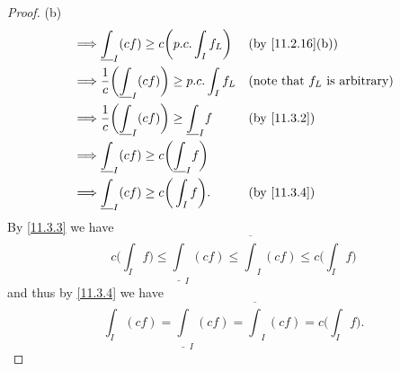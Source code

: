 \begin{proof}{(b)}
\begin{align*}
    \implies & \underline{\int}_I (cf) \geq c \bigg(p.c. \int_I f_L\bigg)                 &  & \by{11.2.16}[b]                         \\
    \implies & \dfrac{1}{c} \bigg(\underline{\int}_I (cf)\bigg) \geq p.c. \int_I f_L      &  & \text{(note that \(f_L\) is arbitrary)} \\
    \implies & \dfrac{1}{c} \bigg(\underline{\int}_I (cf)\bigg) \geq \underline{\int}_I f &  & \by{11.3.2}                             \\
    \implies & \underline{\int}_I (cf) \geq c\bigg(\underline{\int}_I f\bigg)                                                          \\
    \implies & \underline{\int}_I (cf) \geq c\bigg(\int_I f\bigg).                        &  & \by{11.3.4}
  \end{align*}
  By \cref{11.3.3} we have
  \[
    c\bigg(\int_I f\bigg) \leq \underline{\int}_I (cf) \leq \overline{\int}_I (cf) \leq c\bigg(\int_I f\bigg)
  \]
  and thus by \cref{11.3.4} we have
  \[
    \int_I (cf) = \underline{\int}_I (cf) = \overline{\int}_I (cf) = c\bigg(\int_I f\bigg).
  \]


\end{proof}
